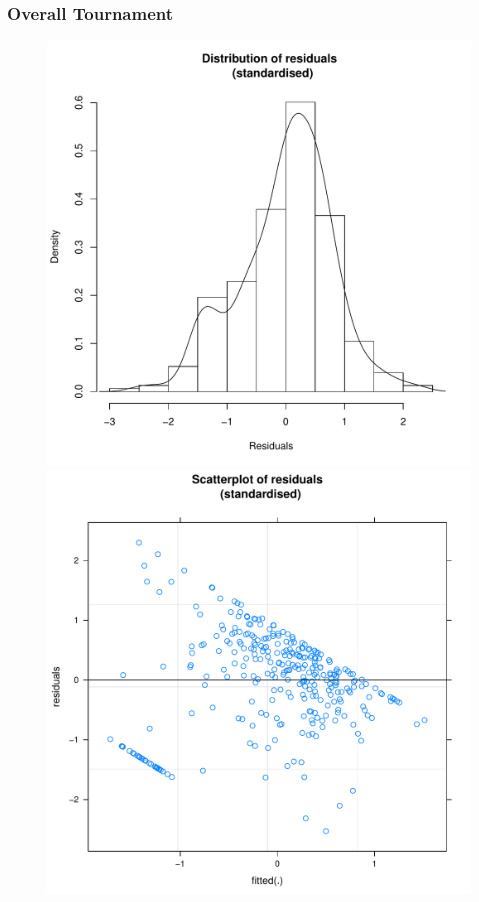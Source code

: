 \begin{CJK}{UTF8}{gbsn}
      \subsubsection{Overall Tournament\label{app8:prediction2bOverall}}



  \begin{figure}[htbp]
   \includegraphics[scale =.4]{images/MLM32aHist.pdf}
        \includegraphics[scale =.4]{images/MLM32aScatter.pdf}

\end{figure}
\end{CJK}
